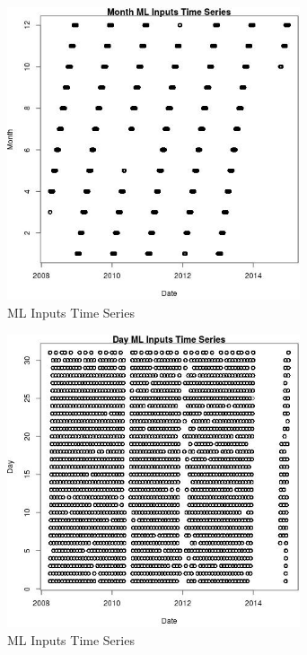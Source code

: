 \begin{figure} 
\centering  
\includegraphics[width=0.77\textwidth]{Code_Outputs/Report_ML_input_PM25_Step4_part_e_de_duplicated_aves_MonthvDate.jpg} 
\caption{\label{fig:Report_ML_input_PM25_Step4_part_e_de_duplicated_avesMonthvDate}ML Inputs Time Series} 
\end{figure} 
 

\begin{figure} 
\centering  
\includegraphics[width=0.77\textwidth]{Code_Outputs/Report_ML_input_PM25_Step4_part_e_de_duplicated_aves_DayvDate.jpg} 
\caption{\label{fig:Report_ML_input_PM25_Step4_part_e_de_duplicated_avesDayvDate}ML Inputs Time Series} 
\end{figure} 
 

